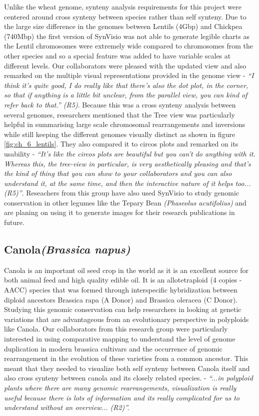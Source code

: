 Unlike the wheat genome, synteny analysis requirements for this project were centered around cross synteny between species rather than self synteny. Due to the large size difference in the genomes between Lentils (4Gbp) and Chickpea (740Mbp) the first version of SynVisio was not able to generate legible charts as the Lentil chromosomes were extremely wide compared to chromosomes from the other species and so a special feature was added to have variable scales at different levels. Our collaborators were pleased with the updated view and also remarked on the multiple visual representations provided in the genome view - \textit{``I think it's quite good, I do really like that there's also the dot plot, in the corner, so that if anything is a little bit unclear, from the parallel view, you can kind of refer back to that.'' (R5)}. Because this was a cross synteny analysis between several genomes, researchers mentioned that the Tree view was particularly helpful in summarising large scale chromosomal rearrangements and inversions while still keeping the different genomes visually distinct as shown in figure \ref{fig:ch_6_lentils}. They also compared it to circos plots and remarked on its usability - \textit{``It's like the circos plots are beautiful but you can't do anything with it. Whereas this, the tree-view in particular, is very aesthetically pleasing and that's the kind of thing that you can show to your collaborators and you can also understand it, at the same time, and then the interactive nature of it helps too...
(R5)''}. Reseachers from this group have also used SynVisio to study genomic conservation in other legumes like the Tepary Bean \textit{(Phaseolus acutifolius)} and are planing on using it to generate images for their research publications in future.

\subsection{Canola\textit{(Brassica napus)}}
Canola is an important oil seed crop in the world as it is an excellent source for both animal feed and high quality edible oil\cite{shahidi1990canola}. It is an allotetraploid (4 copies - AACC) species that was formed through interspecific hybridization between diploid ancestors Brassica rapa (A Donor) and Brassica oleracea (C Donor)\cite{parkin1995identification}. Studying this genomic conservation can help researchers in looking at genetic variations that are advantageous from an evolutionary perspective in polyploids like Canola. Our collaborators from this research group were particularly interested in using comparative mapping to understand the level of genome duplication in modern brassica cultivars and the occurrence of genomic rearrangement in the evolution of these varieties from a common ancestor. This meant that they needed to visualize both self synteny between Canola itself and also cross synteny between canola and its closely related species. - \textit{``...in polyploid plants where there are many genomic rearrangements, visualization is really useful because there is lots of information and its really complicated for us to understand without an overview... (R2)''.}

